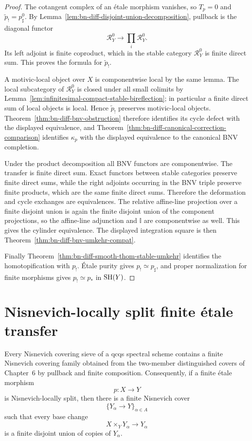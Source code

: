 \begin{proof}
The cotangent complex of an \'etale morphism vanishes, so \(T_p=0\) and
\(\widetilde p_!=p_\sharp^0\).  By
Lemma~\ref{lem:bn-diff-disjoint-union-decomposition}, pullback is the diagonal
functor
\[
  \mathcal R_Y^0
  \longrightarrow
  \prod_i\mathcal R_Y^0.
\]
Its left adjoint is finite coproduct, which in the stable category
\(\mathcal R_Y^0\) is finite direct sum.  This proves the formula for
\(\widetilde p_!\).

A motivic-local object over \(X\) is componentwise local by the same lemma.
The local subcategory of \(\mathcal R_Y^0\) is closed under all small colimits
by Lemma~\ref{lem:infinitesimal-compact-stable-bireflection}; in particular a
finite direct sum of local objects is local.  Hence \(\widetilde p_!\)
preserves motivic-local objects.  Theorem~\ref{thm:bn-diff-bnv-obstruction}
therefore identifies its cycle defect with the displayed equivalence, and
Theorem~\ref{thm:bn-diff-canonical-correction-comparison} identifies
\(\kappa_p\) with the displayed equivalence to the canonical BNV completion.

Under the product decomposition all BNV functors are componentwise.  The
transfer is finite direct sum.  Exact functors between stable categories
preserve finite direct sums, while the right adjoints occurring in the BNV
triple preserve finite products, which are the same finite direct sums.
Therefore the deformation and cycle exchanges are equivalences.  The
relative affine-line projection over a finite disjoint union is again the
finite disjoint union of the component projections, so the affine-line
adjunction and \(\mathbb I\) are componentwise as well.  This gives the
cylinder equivalence.  The displayed integration square is then
Theorem~\ref{thm:bn-diff-bnv-umkehr-compat}.

Finally Theorem~\ref{thm:bn-diff-smooth-thom-stable-umkehr} identifies the
homotopification with \(p_!\).  \'Etale purity gives
\(p_!\simeq p_\sharp\), and proper normalization for finite morphisms gives
\(p_!\simeq p_*\) in \(\mathrm{SH}(Y)\).
\end{proof}

\section{Nisnevich-locally split finite \texorpdfstring{\'etale}{etale} transfer}
\label{sec:bn-diff-locally-split-finite-etale}

\begin{lemma}
\label{lem:bn-diff-base-nisnevich-finite-refinement}
Every Nisnevich covering sieve of a qcqs spectral scheme contains a finite
Nisnevich covering family obtained from the two-member distinguished covers
of Chapter~6 by pullback and finite composition.  Consequently, if a finite
\'etale morphism
\[
    p:X\longrightarrow Y
\]
is Nisnevich-locally split, then there is a finite Nisnevich cover
\[
    \{Y_\alpha\longrightarrow Y\}_{\alpha\in A}
\]
such that every base change
\[
    X\times_YY_\alpha\longrightarrow Y_\alpha
\]
is a finite disjoint union of copies of $Y_\alpha$.
\end{lemma}

